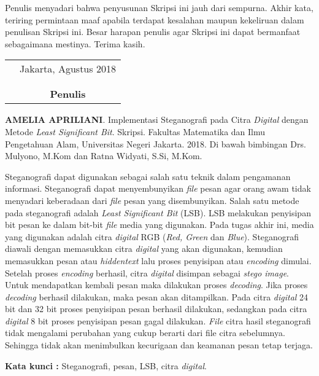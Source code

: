 \documentclass{jtetiskripsi}
\begin{document}
Penulis menyadari bahwa penyusunan Skripsi ini jauh dari sempurna. Akhir kata, teriring permintaan maaf apabila terdapat kesalahan maupun kekeliruan dalam penulisan Skripsi ini. Besar harapan penulis agar Skripsi ini dapat bermanfaat sebagaimana mestinya. Terima kasih.

\vspace{.5cm}

\begin{tabular}{p{7.5cm}c}
	&Jakarta, Agustus 2018\\
	&\\
	&\\
	&\textbf{Penulis}
\end{tabular}

\begin{abstractind}
\textbf{AMELIA APRILIANI}. Implementasi Steganografi pada Citra \emph{Digital} dengan Metode \emph{Least Significant Bit}. Skripsi. Fakultas Matematika dan Ilmu Pengetahuan Alam, Universitas Negeri Jakarta. 2018. Di bawah bimbingan Drs. Mulyono, M.Kom dan Ratna Widyati, S.Si, M.Kom.
\vskip1cm
	
	 Steganografi dapat digunakan sebagai salah satu teknik dalam pengamanan informasi. Steganografi dapat menyembunyikan \emph{file} pesan agar orang awam tidak menyadari keberadaan dari \emph{file} pesan yang disembunyikan. Salah satu metode pada steganografi adalah \emph{Least Significant Bit} (LSB). LSB melakukan penyisipan bit pesan ke dalam bit-bit \emph{file} media yang digunakan. Pada tugas akhir ini, media yang digunakan adalah citra \emph{digital} RGB (\emph{Red, Green} dan \emph{Blue}). Steganografi diawali dengan memasukkan citra \emph{digital} yang akan digunakan, kemudian memasukkan pesan atau \emph{hiddentext} lalu proses penyisipan atau \emph{encoding} dimulai. Setelah proses \emph{encoding} berhasil, citra \emph{digital} disimpan sebagai \emph{stego image}. Untuk mendapatkan kembali pesan maka dilakukan proses \emph{decoding}. Jika proses \emph{decoding} berhasil dilakukan, maka pesan akan ditampilkan. Pada citra \emph{digital} 24 bit dan 32 bit proses penyisipan pesan berhasil dilakukan, sedangkan pada citra \emph{digital} 8 bit proses penyisipan pesan gagal dilakukan. \emph{File} citra hasil steganografi tidak mengalami perubahan yang cukup berarti dari file citra sebelumnya. Sehingga tidak akan menimbulkan kecurigaan dan keamanan pesan tetap terjaga.
	
	\bigskip
	\noindent
	\textbf{Kata kunci :} Steganografi, pesan, LSB, citra \emph{digital}.
\end{abstractind}
\end{document}

